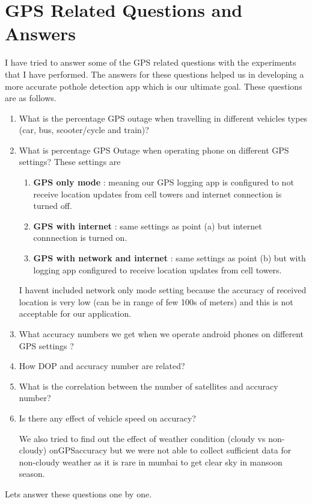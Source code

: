 \documentclass[12pt]{report}
\begin{document}
\section{GPS Related Questions and Answers}
I have tried to answer some of the GPS related questions with the experiments
that I have performed. The answers for these questions helped us in developing a
more accurate pothole detection app which is our ultimate goal. These questions
are as follows.
\begin{enumerate}
\item \label{q1} What is the percentage GPS outage when travelling in different vehicles types
  (car, bus, scooter/cycle and train)?
\item What is percentage GPS Outage when operating phone on different GPS settings?  
These settings are
  \begin{enumerate}
  \item \textbf{GPS only mode} : meaning our GPS logging app is configured to
    not receive location updates from cell towers and internet connection is
    turned off.
  \item \textbf{GPS with internet} : same settings as point (a) but internet connnection is
    turned on.
  \item  \textbf{GPS with network and internet} : same settings as point (b) but
    with logging app configured to receive location updates from cell towers.
  \end{enumerate}
  I haven\textquotesingle{}t included network only mode setting because the
  accuracy of received location is very low (can be in range of few 100s of
  meters) and this is not acceptable for our application.
\item What accuracy numbers we get when we operate android phones on different
 GPS settings ? 
\item How DOP and accuracy number are related?
\item What is the correlation between the number of satellites and accuracy
  number?
\item Is there any effect of vehicle speed on accuracy?

  We also tried to find out the effect of weather condition (cloudy vs
  non-cloudy) onGPSaccuracy but we were not able to collect sufficient data
  for non-cloudy weather as it is rare in mumbai to get clear sky in mansoon
  season.

\end{enumerate}

Lets answer these questions one by one.
\end{document}
